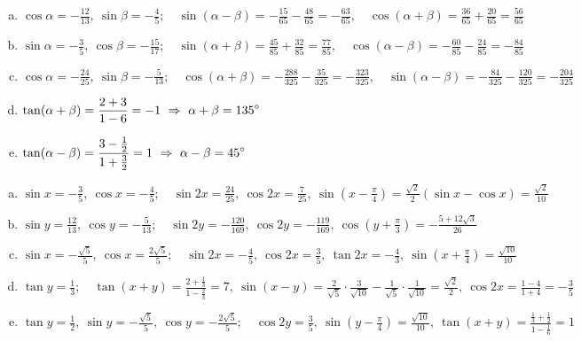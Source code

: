 \documentclass[a4paper,12pt]{letter}
\begin{document}
\begin{resitev}
\begin{enumerate}[a)]
\item $\displaystyle \cos\alpha=-\tfrac{12}{13},\ \sin\beta=-\tfrac45;\quad \sin(\alpha-\beta)=-\tfrac{15}{65}-\tfrac{48}{65}=-\frac{63}{65},\quad \cos(\alpha+\beta)=\tfrac{36}{65}+\tfrac{20}{65}=\frac{56}{65}$
\item $\displaystyle \sin\alpha=-\tfrac35,\ \cos\beta=-\tfrac{15}{17};\quad \sin(\alpha+\beta)=\tfrac{45}{85}+\tfrac{32}{85}=\frac{77}{85},\quad \cos(\alpha-\beta)=-\tfrac{60}{85}-\tfrac{24}{85}=-\frac{84}{85}$
\item $\displaystyle \cos\alpha=-\tfrac{24}{25},\ \sin\beta=-\tfrac{5}{13};\quad \cos(\alpha+\beta)=-\tfrac{288}{325}-\tfrac{35}{325}=-\frac{323}{325},\quad \sin(\alpha-\beta)=-\tfrac{84}{325}-\tfrac{120}{325}=-\frac{204}{325}$
\item $\displaystyle \tan(\alpha+\beta)=\frac{2+3}{1-6}=-1\ \Rightarrow\ \alpha+\beta=135\degree$
\item $\displaystyle \tan(\alpha-\beta)=\frac{3-\frac12}{1+\frac32}=1\ \Rightarrow\ \alpha-\beta=45\degree$
\end{enumerate}
\end{resitev}

\begin{resitev}
\begin{enumerate}[a)]
\item $\displaystyle \sin x=-\tfrac35,\ \cos x=-\tfrac45;\quad \sin2x=\frac{24}{25},\ \cos2x=\frac{7}{25},\ \sin\left(x-\tfrac{\pi}{4}\right)=\tfrac{\sqrt2}{2}(\sin x-\cos x)=\frac{\sqrt2}{10}$
\item $\displaystyle \sin y=\tfrac{12}{13},\ \cos y=-\tfrac{5}{13};\quad \sin2y=-\frac{120}{169},\ \cos2y=-\frac{119}{169},\ \cos\left(y+\tfrac{\pi}{3}\right)=-\frac{5+12\sqrt3}{26}$
\item $\displaystyle \sin x=-\tfrac{\sqrt5}{5},\ \cos x=\tfrac{2\sqrt5}{5};\quad \sin2x=-\frac45,\ \cos2x=\frac35,\ \tan2x=-\frac43,\ \sin\left(x+\tfrac{\pi}{4}\right)=\frac{\sqrt{10}}{10}$
\item $\displaystyle \tan y=\tfrac13;\quad \tan(x+y)=\frac{2+\frac13}{1-\frac23}=7,\ \sin(x-y)=\tfrac{2}{\sqrt5}\cdot\tfrac{3}{\sqrt{10}}-\tfrac{1}{\sqrt5}\cdot\tfrac{1}{\sqrt{10}}=\frac{\sqrt2}{2},\ \cos2x=\frac{1-4}{1+4}=-\frac35$
\item $\displaystyle \tan y=\tfrac12,\ \sin y=-\tfrac{\sqrt5}{5},\ \cos y=-\tfrac{2\sqrt5}{5};\quad \cos2y=\frac35,\ \sin\left(y-\tfrac{\pi}{4}\right)=\frac{\sqrt{10}}{10},\ \tan(x+y)=\frac{\frac13+\frac12}{1-\frac16}=1$
\end{enumerate}
\end{resitev}
\end{document}
